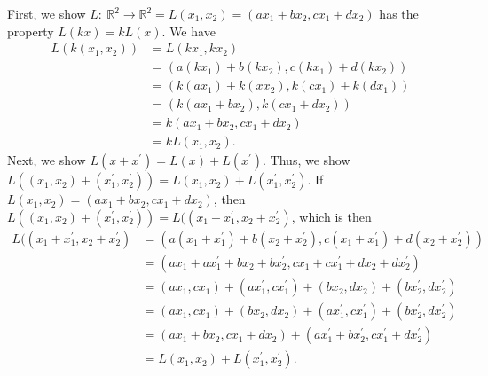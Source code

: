\documentclass{report}
\begin{document}
\begin{itemize}
            \bigbreak \noindent 
            First, we show $L:\ \mathbb{R}^{2} \to \mathbb{R}^{2} = L(x_{1}, x_{2}) = (ax_{1} + bx_{2}, cx_{1} + dx_{2})$ has the property $L(kx) = kL(x)$. We have
            \begin{align*}
                L(k(x_{1}, x_{2})) &= L(kx_{1}, kx_{2})  \\
                                   &= (a(kx_{1}) + b(kx_{2}), c(kx_{1}) + d(kx_{2})) \\
                                   &= ( k(ax_{1}) + k(xx_{2}), k(cx_{1}) + k(dx_{1})) \\
                                   &= (k (ax_{1} +  bx_{2}), k(cx_{1} + dx_{2})) \\
                                   &= k(ax_{1} + bx_{2}, c x_{1} + dx_{2}) \\
                                   &=kL(x_{1}, x_{2})
            .\end{align*}
            \bigbreak \noindent 
            Next, we show $L(x + x^{\prime})  =L(x) + L(x^{\prime})$. Thus, we show $L( (x_{1}, x_{2}) + (x^{\prime}_{1}, x^{\prime}_{2})) = L(x_{1}, x_{2}) + L(x^{\prime}_{1}, x^{\prime}_{2})$. If $L(x_{1}, x_{2})  = (ax_{1} + bx_{2}, cx_{1} +  dx_{2})$, then $L( (x_{1}, x_{2}) +  (x^{\prime}_{1}, x^{\prime}_{2})) = L( (x_{1} + x^{\prime}_{1}, x_{2} + x^{\prime}_{2})$, which is then
            \begin{align*}
                L( (x_{1} + x^{\prime}_{1}, x_{2} + x^{\prime}_{2}) &=   (a(x_{1} + x^{\prime}_{1}) + b(x_{2} + x^{\prime}_{2}), c(x_{1} + x^{\prime}_{1}) + d(x_{2} + x^{\prime}_{2}) )\\
                                                                    &= (ax_{1} + ax^{\prime}_{1} + bx_{2} +bx^{\prime}_{2}, cx_{1} + cx^{\prime}_{1} + dx_{2} + dx^{\prime}_{2})  \\
                                                                    &= (ax_{1}, cx_{1}) + (ax^{\prime}_{1}, cx^{\prime}_{1}) + (bx_{2}, dx_{2}) + (bx^{\prime}_{2}, dx^{\prime}_{2}) \\
                                                                    &= (ax_{1}, cx_{1}) + (bx_{2}, dx_{2}) +  (ax^{\prime}_{1}, cx^{\prime}_{1}) + (bx^{\prime}_{2}, dx^{\prime}_{2}) \\
                                                                    &= (ax_{1} + bx_{2}, cx_{1} + dx_{2}) + (ax^{\prime}_{1} + bx^{\prime}_{2}, cx^{\prime}_{1} + dx^{\prime}_{2}) \\
                                                                    &=L(x_{1}, x_{2}) + L(x^{\prime}_{1}, x^{\prime}_{2})
            .\end{align*}
    

\end{itemize}
\end{document}

